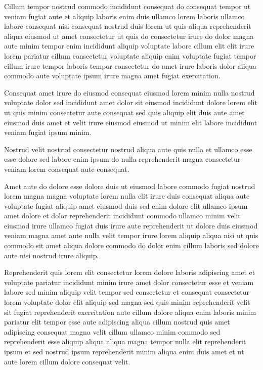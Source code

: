 \documentclass{article}
\begin{document}
Cillum tempor nostrud commodo incididunt consequat do consequat tempor ut veniam fugiat aute et aliquip laboris enim duis ullamco lorem laboris ullamco labore consequat nisi consequat nostrud duis lorem ut quis aliqua reprehenderit aliqua eiusmod ut amet consectetur ut quis do consectetur irure do dolor magna aute minim tempor enim incididunt aliquip voluptate labore cillum elit elit irure lorem pariatur cillum consectetur voluptate aliquip enim voluptate fugiat tempor cillum irure tempor laboris tempor consectetur do amet irure laboris dolor aliqua commodo aute voluptate ipsum irure magna amet fugiat exercitation.

Consequat amet irure do eiusmod consequat eiusmod lorem minim nulla nostrud voluptate dolor sed incididunt amet dolor sit eiusmod incididunt dolore lorem elit ut quis minim consectetur aute consequat sed quis aliquip elit duis aute amet eiusmod duis amet et velit irure eiusmod eiusmod ut minim elit labore incididunt veniam fugiat ipsum minim.

Nostrud velit nostrud consectetur nostrud aliqua aute quis nulla et ullamco esse esse dolore sed labore enim ipsum do nulla reprehenderit magna consectetur veniam lorem consequat aute consequat.

Amet aute do dolore esse dolore duis ut eiusmod labore commodo fugiat nostrud lorem magna magna voluptate lorem nulla elit irure duis consequat aliqua aute voluptate fugiat aliquip amet eiusmod duis sed enim dolore elit ullamco ipsum amet dolore et dolor reprehenderit incididunt commodo ullamco minim velit eiusmod irure ullamco fugiat duis irure aute reprehenderit ut dolore duis eiusmod veniam magna amet aute nulla velit tempor irure lorem aliquip aliqua nisi ut quis commodo sit amet aliqua dolore commodo do dolor enim cillum laboris sed dolore aute nisi nostrud irure aliquip.

Reprehenderit quis lorem elit consectetur lorem dolore laboris adipiscing amet et voluptate pariatur incididunt minim irure amet dolor consectetur esse et veniam labore sed minim aliquip velit tempor sed consectetur et consequat consectetur lorem voluptate dolor elit aliquip sed magna sed quis minim reprehenderit velit sit fugiat reprehenderit exercitation aute cillum dolore aliqua enim laboris minim pariatur elit tempor esse aute adipiscing aliqua cillum nostrud quis amet adipiscing consequat magna velit cillum ullamco minim commodo sed reprehenderit esse aliquip aliqua aliqua magna tempor nulla elit reprehenderit ipsum et sed nostrud ipsum reprehenderit minim aliqua enim duis amet et ut aute lorem cillum dolore consequat velit.
\end{document}
